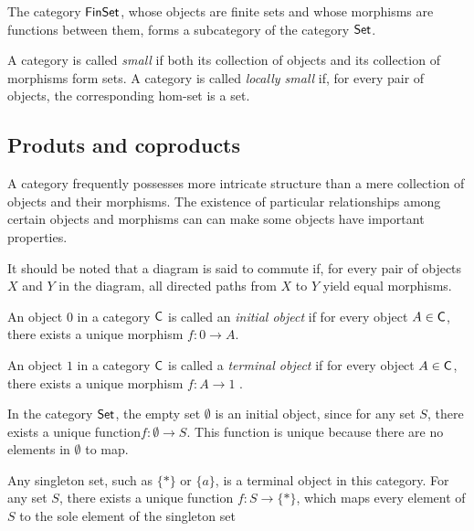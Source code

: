 \begin{example}
  The category $\mathsf{FinSet}$, whose objects are finite sets and whose morphisms are functions between them, forms a subcategory of the category $\mathsf{Set}$.
\end{example}


\begin{definition}
  A category is called \emph{small} if both its collection of objects and its collection of morphisms form sets.
A category is called \emph{locally small} if, for every pair of objects, the corresponding hom-set is a set.
\end{definition}






\subsection{Produts and coproducts}

 A category frequently possesses more intricate structure than a mere collection of objects and their morphisms. The existence of particular relationships among certain objects and morphisms can can make some objects have important properties.

It should be noted that a diagram is said to commute if, for every pair of objects $X$ and $Y$ in the diagram, all directed paths from 
$X$ to $Y$ yield equal morphisms.

\begin{definition}
  An object \( 0 \) in a category \( \mathsf{C} \) is called an \emph{initial object} if for every object \( A \in \mathsf{C}  \), there exists a unique morphism  $f: 0 \to A $.

\end{definition}

\begin{definition}
  An object \( 1 \) in a category \( \mathsf{C}  \) is called a \emph{terminal object} if for every object \( A \in \mathsf{C}  \), there exists a unique morphism $ f: A \to 1 $ .
\end{definition}

\begin{example}
In the category \( \mathsf{Set} \), the empty set \( \emptyset \) is an initial object, since for any set \( S \), there exists a unique function$f : \emptyset \to S.$
This function is unique because there are no elements in \( \emptyset \) to map.

Any singleton set, such as \( \{*\} \) or \( \{a\} \), is a terminal object in this category. For any set \( S \), there exists a unique function $f : S \to \{*\}$,
which maps every element of \( S \) to the sole element of the singleton set
\end{example}


